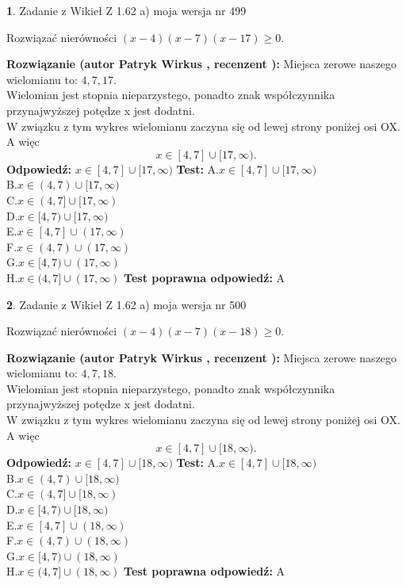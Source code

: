 \documentclass[12pt, a4paper]{article}
\theoremstyle{definition} %
\newtheorem{zad}{}
\newcommand{\zadStart}[1]{\begin{zad}#1\newline}
\newcommand{\zadStop}{\end{zad}}
\newcommand{\rozwStart}[2]{\noindent \textbf{Rozwiązanie (autor #1 , recenzent #2): }\newline}
\newcommand{\rozwStop}{\newline}
\newcommand{\odpStart}{\noindent \textbf{Odpowiedź:}\newline}
\newcommand{\odpStop}{\newline}
\newcommand{\testStart}{\noindent \textbf{Test:}\newline}
\newcommand{\testStop}{\newline}
\newcommand{\kluczStart}{\noindent \textbf{Test poprawna odpowiedź:}\newline}
\newcommand{\kluczStop}{\newline}
\begin{document}
\zadStart{Zadanie z Wikieł Z 1.62 a) moja wersja nr 499}

Rozwiązać nierówności $(x-4)(x-7)(x-17)\ge0$.
\zadStop
\rozwStart{Patryk Wirkus}{}
Miejsca zerowe naszego wielomianu to: $4, 7, 17$.\\
Wielomian jest stopnia nieparzystego, ponadto znak współczynnika przy\linebreak najwyższej potędze x jest dodatni.\\ W związku z tym wykres wielomianu zaczyna się od lewej strony poniżej osi OX. A więc $$x \in [4,7] \cup [17,\infty).$$
\rozwStop
\odpStart
$x \in [4,7] \cup [17,\infty)$
\odpStop
\testStart
A.$x \in [4,7] \cup [17,\infty)$\\
B.$x \in (4,7) \cup [17,\infty)$\\
C.$x \in (4,7] \cup [17,\infty)$\\
D.$x \in [4,7) \cup [17,\infty)$\\
E.$x \in [4,7] \cup (17,\infty)$\\
F.$x \in (4,7) \cup (17,\infty)$\\
G.$x \in [4,7) \cup (17,\infty)$\\
H.$x \in (4,7] \cup (17,\infty)$
\testStop
\kluczStart
A
\kluczStop



\zadStart{Zadanie z Wikieł Z 1.62 a) moja wersja nr 500}

Rozwiązać nierówności $(x-4)(x-7)(x-18)\ge0$.
\zadStop
\rozwStart{Patryk Wirkus}{}
Miejsca zerowe naszego wielomianu to: $4, 7, 18$.\\
Wielomian jest stopnia nieparzystego, ponadto znak współczynnika przy\linebreak najwyższej potędze x jest dodatni.\\ W związku z tym wykres wielomianu zaczyna się od lewej strony poniżej osi OX. A więc $$x \in [4,7] \cup [18,\infty).$$
\rozwStop
\odpStart
$x \in [4,7] \cup [18,\infty)$
\odpStop
\testStart
A.$x \in [4,7] \cup [18,\infty)$\\
B.$x \in (4,7) \cup [18,\infty)$\\
C.$x \in (4,7] \cup [18,\infty)$\\
D.$x \in [4,7) \cup [18,\infty)$\\
E.$x \in [4,7] \cup (18,\infty)$\\
F.$x \in (4,7) \cup (18,\infty)$\\
G.$x \in [4,7) \cup (18,\infty)$\\
H.$x \in (4,7] \cup (18,\infty)$
\testStop
\kluczStart
A
\kluczStop
\end{document}
